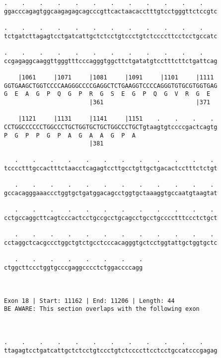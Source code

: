 \documentclass{article}
\begin{document}
\begin{Verbatim}
.    .    .    .    .    .    .    .    .    .    .    .    
ggacccagagtggcaagagagcagcccgttcactaacacctttgtcctgggttctccgtc
                                                            
.    .    .    .    .    .    .    .    .    .    .    .    
tctgatcttagagtcctgatcattgctctcctgtccctgtctccccttcctcctgccatc
                                                            
.    .    .    .    .    .    .    .    .    .    .    .    
ccgagaggcaaggttgggtttcccagggtggcttctgatatgtcctttcttctgattcag
                                                            
    |1061     |1071     |1081     |1091     |1101     |1111 
GGTGAAGCTGGTCCCCAAGGGCCCCGAGGCTCTGAAGGTCCCCAGGGTGTGCGTGGTGAG
G  E  A  G  P  Q  G  P  R  G  S  E  G  P  Q  G  V  R  G  E  
                        |361                          |371  
  
    |1121     |1131     |1141     |1151    .    .    .    . 
CCTGGCCCCCCTGGCCCTGCTGGTGCTGCTGGCCCTGCTgtaagtgtccccgactcagtg
P  G  P  P  G  P  A  G  A  A  G  P  A                       
                        |381                                
  
   .    .    .    .    .    .    .    .    .    .    .    . 
tcccctttgccactttctaacctcagagtccttgcctgttgctgacactcctttctctgt
                                                            
   .    .    .    .    .    .    .    .    .    .    .    . 
gccacagggaaaccctggtgctgatggacagcctggtgctaaaggtgccaatgtaagtat
                                                            
   .    .    .    .    .    .    .    .    .    .    .    . 
cctgccaggcttcagtcccactcctgccgcctgcagcctgcctgcccctttccctctgct
                                                            
   .    .    .    .    .    .    .    .    .    .    .    . 
cctaggctcacgccctggctgtctgcctcccacagggtgctcctggtattgctggtgctc
                                                            
   .    .    .    .    .    .    .    .
ctggcttccctggtgcccgaggcccctctggaccccagg
                                       
                                       
 
Exon 18 | Start: 11162 | End: 11206 | Length: 44
BE AWARE: This section overlaps with the following exon



.    .    .    .    .    .    .    .    .    .    .    .    
ttagagtcctgatcattgctctcctgtccctgtctccccttcctcctgccatcccgagag
                                                            

\end{Verbatim}
\end{document}
